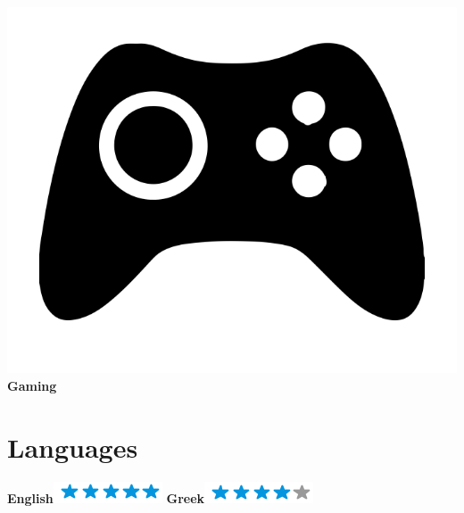 \documentclass[]{friggeri-cv}
\begin{document}
\begin{aside}
        \includegraphics[scale=0.05]{img/gaming.png} 
    \textbf{Gaming}
    ~
  \section{Languages}
    \textbf{English}\includegraphics[scale=0.40]{img/5stars.png}
    \textbf{Greek}\includegraphics[scale=0.40]{img/4stars.png}
\end{aside}
\end{document}
